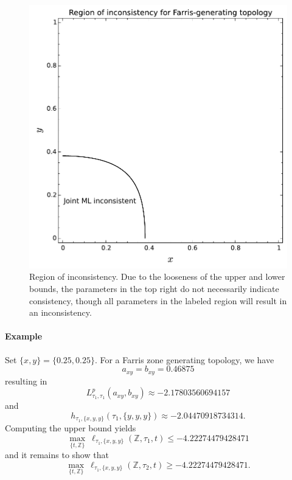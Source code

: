 \documentclass[a4paper]{article}
\newcommand{\fullAncestralStateCategories}{\mathbb{Z}}
\begin{document}
\begin{figure}
\centering
\includegraphics[width=.9\textwidth]{analytic-inconsistency}
\caption{
    Region of inconsistency.
    Due to the looseness of the upper and lower bounds, the parameters in the top right do not necessarily indicate consistency, though all parameters in the labeled region will result in an inconsistency.
}
\label{fig:inconsistency-farris}
\end{figure}

\paragraph{Example}

Set $\{x, y\} = \{0.25, 0.25\}$.
For a Farris zone generating topology, we have
$$
a_{xy} = b_{xy} = 0.46875
$$
resulting in
$$
L^{p}_{\tau_1,\tau_1}(a_{xy},b_{xy}) \approx -2.17803560694157
$$
and
$$
h_{\tau_1,\{x,y,y\}}(\tau_1,\{y, y, y\})  \approx -2.04470918734314.
$$
Computing the upper bound yields
$$
\max_{\{t,\fullAncestralStateCategories\}} \ \ell_{\tau_1,\{x,y,y\}}(\fullAncestralStateCategories,\tau_1,t) \le -4.22274479428471
$$
and it remains to show that
$$
\max_{\{t,\fullAncestralStateCategories\}} \ \ell_{\tau_1,\{x,y,y\}}(\fullAncestralStateCategories,\tau_2,t) \ge -4.22274479428471.
$$
\end{document}
